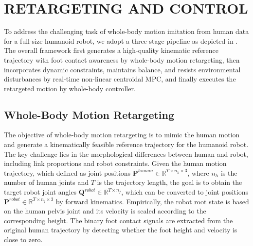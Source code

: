 \documentclass[a4paper, 10pt, conference]{ieeeconf}      %
\begin{document}


\section{RETARGETING AND CONTROL}

To address the challenging task of whole-body motion imitation from human data for a full-size humanoid robot, we adopt a three-stage pipeline as depicted in . The overall framework first generates a high-quality kinematic reference trajectory with foot contact awareness by whole-body motion retargeting, then incorporates dynamic constraints, maintains balance, and resists environmental disturbances by real-time non-linear centroidal MPC, and finally executes the retargeted motion by whole-body controller.

\subsection{Whole-Body Motion Retargeting}

The objective of whole-body motion retargeting is to mimic the human motion and generate a kinematically feasible reference trajectory for the humanoid robot. The key challenge lies in the morphological differences between human and robot, including link proportions and robot constraints. Given the human motion trajectory, which defined as joint positions $\boldsymbol{P}^{human} \in \mathbb{R}^{T \times n_h \times 3}$, where $n_h$ is the number of human joints and $T$ is the trajectory length, the goal is to obtain the target robot joint angles $\boldsymbol{Q}^{robot} \in \mathbb{R}^{T \times n_j}$, which can be converted to joint positions $\boldsymbol{P}^{robot} \in \mathbb{R}^{T \times n_j \times 3}$ by forward kinematics. Empirically, the robot root state is based on the human pelvis joint and its velocity is scaled according to the corresponding height. The binary foot contact signals are extracted from the original human trajectory by detecting whether the foot height and velocity is close to zero.
\end{document}

